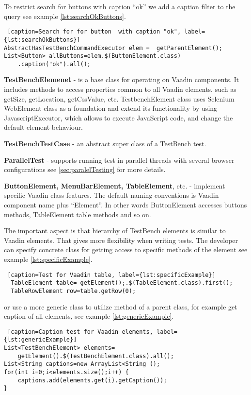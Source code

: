 To restrict search for buttons with caption ``ok'' we add a caption filter to
the query see example \ref{lst:searchOkButtons}.
  \lstset{style=a1listing}
  \begin{lstlisting} [caption=Search for for button  with caption "ok", label={lst:searchOkButtons}]
AbstractHasTestBenchCommandExecutor elem =  getParentElement();
List<Button> allButtons=elem.$(ButtonElement.class)
	.caption("ok").all();
  \end{lstlisting}
  
\textbf{TestBenchElemenet} - is a base class for operating on Vaadin components.
It includes methods to access properties common to all Vaadin elements,
such as getSize, getLocation, getCssValue, etc.
TestbenchElement class uses Selenium WebElement class as a foundation and extend
its functionality by using JavascriptExecutor,
which allows to execute JavaScript code, and change the default element behaviour.

\textbf{TestBenchTestCase} - an abstract super class of a TestBench test.

\textbf{ParallelTest} - supports running test in parallel threads with several
browser configurations see \ref{sec:paralelTesting} for more details.

\textbf{ButtonElement, MenuBarElement, TableElement}, etc. - implement specific
Vaadin class features. The default naming conventions is Vaadin component name
plus ``Element''. In other words ButtonElement accesses buttons methods,
TableElement table methods and so on.

The important aspect is that hierarchy of TestBench elements is similar to
Vaadin elements.
That gives more flexibility when writing tests. The  developer can
specify concrete class for getting access to specific methods of the element see example \ref{lst:specificExample}.
 
\lstset{style=a1listing}
\begin{lstlisting} [caption=Test for Vaadin table, label={lst:specificExample}]
  TableElement table= getElement();.$(TableElement.class).first();
  TableRowElement row=table.getRow(0);
 \end{lstlisting}
 
or use a more generic class to utilize method of a parent class, for example get
caption of all elements, see example \ref{lst:genericExample}.

\lstset{style=a1listing}
\begin{lstlisting} [caption=Caption test for Vaadin elements, label={lst:genericExample}]
List<TestBenchElement> elements=
	getElement().$(TestBenchElement.class).all();
List<String captions=new ArrayList<String ();
for(int i=0;i<elements.size();i++) {
	captions.add(elements.get(i).getCaption());
}
\end{lstlisting}

